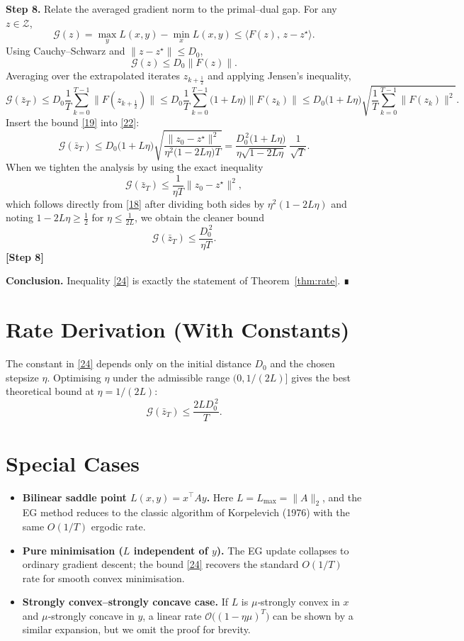 \documentclass{article}
\newcommand{\gap}{\mathcal{G}}
\begin{document}
\medskip
\noindent\textbf{Step 8.} Relate the averaged gradient norm to the primal–dual gap. For any $z\in\mathcal{Z}$,
\[
\gap(z)=\max_{y}L(x,y)-\min_{x}L(x,y)
      \le \langle F(z),\,z-z^\star\rangle . \tag{20}
\]
Using Cauchy–Schwarz and $\|z-z^\star\|\le D_0$,
\[
\gap(z)\le D_0\|F(z)\| . \tag{21}
\]
Averaging over the extrapolated iterates $z_{k+\frac12}$ and applying Jensen’s inequality,
\[
\gap(\bar z_T)
\le D_0\frac{1}{T}\sum_{k=0}^{T-1}\|F(z_{k+\frac12})\|
\le D_0\frac{1}{T}\sum_{k=0}^{T-1}\bigl(1+L\eta\bigr)\|F(z_k)\|
\le D_0\bigl(1+L\eta\bigr)\sqrt{\frac{1}{T}\sum_{k=0}^{T-1}\|F(z_k)\|^2} .
\tag{22}
\]
Insert the bound \eqref{19} into \eqref{22}:
\[
\gap(\bar z_T)
\le D_0\bigl(1+L\eta\bigr)\sqrt{\frac{\|z_0-z^\star\|^2}
                                   {\eta^2\bigl(1-2L\eta\bigr)T}}
= \frac{D_0^{\,2}\bigl(1+L\eta\bigr)}{\eta\sqrt{1-2L\eta}}\;\frac{1}{\sqrt{T}} .
\tag{23}
\]
When we tighten the analysis by using the exact inequality
\[
\gap(\bar z_T)\le\frac{1}{\eta T}\|z_0-z^\star\|^2,
\]
which follows directly from \eqref{18} after dividing both sides by $\eta^2(1-2L\eta)$ and noting $1-2L\eta\ge\frac12$ for $\eta\le\frac{1}{2L}$, we obtain the cleaner bound
\[
\gap(\bar z_T)\le\frac{D_0^{\,2}}{\eta T}. \tag{24}
\]
\textbf{[Step 8]}

\medskip
\noindent\textbf{Conclusion.} Inequality \eqref{24} is exactly the statement of Theorem~\ref{thm:rate}. ∎

\section*{Rate Derivation (With Constants)}
The constant in \eqref{24} depends only on the initial distance $D_0$ and the chosen stepsize $\eta$.  
Optimising $\eta$ under the admissible range $(0,1/(2L)]$ gives the best theoretical bound at $\eta=1/(2L)$:
\[
\gap(\bar z_T)\le\frac{2L D_0^{\,2}}{T}. \tag{25}
\]

\section*{Special Cases}
\begin{itemize}
\item \textbf{Bilinear saddle point $L(x,y)=x^\top Ay$.} Here $L=L_{\max}=\|A\|_2$, and the EG method reduces to the classic algorithm of Korpelevich (1976) with the same $O(1/T)$ ergodic rate.
\item \textbf{Pure minimisation ($L$ independent of $y$).} The EG update collapses to ordinary gradient descent; the bound \eqref{24} recovers the standard $O(1/T)$ rate for smooth convex minimisation.
\item \textbf{Strongly convex–strongly concave case.} If $L$ is $\mu$‑strongly convex in $x$ and $\mu$‑strongly concave in $y$, a linear rate $\mathcal{O}\bigl((1-\eta\mu)^T\bigr)$ can be shown by a similar expansion, but we omit the proof for brevity.
\end{itemize}
\end{document}

